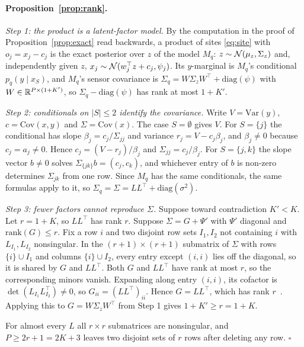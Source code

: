 \paragraph{Proposition~\ref{prop:rank}.}
\emph{Step 1: the product is a latent-factor model.} By the computation in the proof of Proposition~\ref{prop:exact}
read backwards, a product of sites \eqref{eq:site} with $o_j=x_j-c_j$ is the exact posterior over $z$ of the model
$M_q$: $z\sim\mathcal{N}(\mu_z,\Sigma_z)$ and, independently given $z$, $x_j\sim\mathcal{N}(w_j^\top z+c_j,\psi_j)$. Its $y$-marginal is
$M_q$'s conditional $p_q(y\mid x_S)$, and $M_q$'s sensor covariance is $\Sigma_q=W\Sigma_zW^\top+\mathrm{diag}(\psi)$
with $W\in\mathbb{R}^{P\times(1+K')}$, so $\Sigma_q-\mathrm{diag}(\psi)$ has rank at most $1+K'$.

\emph{Step 2: conditionals on $|S|\leq2$ identify the covariance.} Write $V=\mathrm{Var}(y)$, $c=\mathrm{Cov}(x,y)$
and $\Sigma=\mathrm{Cov}(x)$. The case $S=\emptyset$ gives $V$. For $S=\{j\}$ the conditional has slope
$\beta_j=c_j/\Sigma_{jj}$ and variance $r_j=V-c_j\beta_j$, and $\beta_j\neq0$ because $c_j=a_j\neq0$. Hence
$c_j=(V-r_j)/\beta_j$ and $\Sigma_{jj}=c_j/\beta_j$. For $S=\{j,k\}$ the slope vector $b\neq0$ solves
$\Sigma_{\{jk\}}b=(c_j,c_k)$, and whichever entry of $b$ is non-zero determines $\Sigma_{jk}$ from one row. Since
$M_q$ has the same conditionals, the same formulas apply to it, so $\Sigma_q=\Sigma=LL^\top+\mathrm{diag}(\sigma^2)$.

\emph{Step 3: fewer factors cannot reproduce $\Sigma$.} Suppose toward contradiction $K'<K$. Let $r=1+K$, so $LL^\top$ has rank $r$. Suppose
$\Sigma=G+\Psi'$ with $\Psi'$ diagonal and $\mathrm{rank}(G)\leq r$. Fix a row $i$ and two disjoint row sets $I_1,I_2$
not containing $i$ with $L_{I_1},L_{I_2}$ nonsingular. In the $(r+1)\times(r+1)$ submatrix of $\Sigma$ with rows
$\{i\}\cup I_1$ and columns $\{i\}\cup I_2$, every entry except $(i,i)$ lies off the diagonal, so it is shared by $G$
and $LL^\top$. Both $G$ and $LL^\top$ have rank at most $r$, so the corresponding minors vanish. Expanding along entry
$(i,i)$, its cofactor is $\det(L_{I_1}L_{I_2}^\top)\neq0$, so $G_{ii}=(LL^\top)_{ii}$. Hence $G=LL^\top$, which has
rank $r$~\citep{anderson1956statistical}. Applying this to $G=W\Sigma_zW^\top$ from Step 1 gives $1+K'\geq r=1+K$.

For almost every $L$ all $r\times r$ submatrices are nonsingular, and $P\geq2r+1=2K+3$ leaves two disjoint sets of $r$
rows after deleting any row. \hfill$\square$

